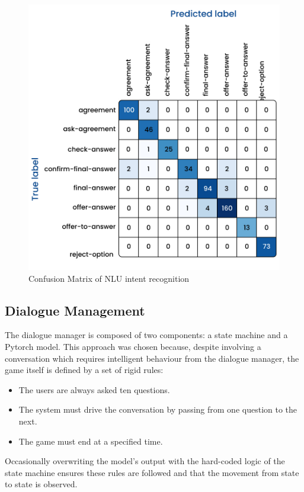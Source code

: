 \documentclass[hidelinks, 11pt]{article}
\begin{document}
\begin{figure}[h!]
  \includegraphics[width=\columnwidth]{images/intent_confusion_matrix.jpg}
  \caption{Confusion Matrix of NLU intent recognition}
  \label{fig:cm_intent_recognition}
\end{figure}

\subsection{Dialogue Management}
\label{subsec:dialogue_management}

The dialogue manager is composed of two components: a state machine and a Pytorch model. This approach was chosen because, despite involving a conversation which requires intelligent behaviour from the dialogue manager, the game itself is defined by a set of rigid rules:
\begin{itemize}
  \item The users are always asked ten questions.
  \item The system must drive the conversation by passing from one question to the next.
  \item The game must end at a specified time.
\end{itemize}
\noindent Occasionally overwriting the model's output with the hard-coded logic of the state machine ensures these rules are followed and that the movement from state to state is observed.
\end{document}
